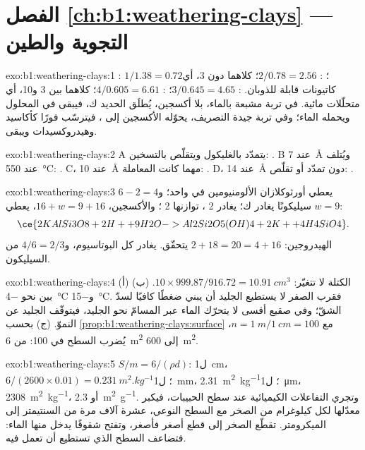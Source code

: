 \section*{الفصل \ref{ch:b1:weathering-clays} --- التجوية والطين}

\begin{solution}{exo:b1:weathering-clays:1}
: $1/1.38 = 0.72$؛ : $2/0.78 = 2.56$؛ كلاهما دون 3، أي كاتيونات قابلة للذوبان. : $3/0.645 = 4.65$؛ : $4/0.605 = 6.61$؛ كلاهما بين 3 و\num{10}، أي متحلّلات مائية. في تربة مشبعة بالماء، بلا أكسجين، يُطلَق الحديد ك، فيبقى في المحلول ويحمله الماء؛ وفي تربة جيدة التصريف، يحوّله الأكسجين إلى ، فيترسّب فورًا كأكاسيد وهيدروكسيدات ويبقى.
\end{solution}

\begin{solution}{exo:b1:weathering-clays:2}
A يتمدّد بالغليكول ويتقلّص بالتسخين: . B عند \SI{7}{\angstrom} ويُتلف عند \SI{550}{\celsius}: . C، عند \SI{10}{\angstrom} مهما كانت المعاملة: . D، عند \SI{14}{\angstrom} دون تمدّد أو تقلّص: .
\end{solution}

\begin{solution}{exo:b1:weathering-clays:3}
يعطي أورثوكلازان الألومنيومين في  واحد؛ و$6 - 2 = 4$ سيليكونًا يغادر ك؛ يغادر 2 ، توازنها 2 ؛ والأكسجين، $16 + w = 9 + 16$، يعطي $w = 9$:
\[
  \ce{2 KAlSi3O8 + 2 H+ + 9 H2O -> Al2Si2O5(OH)4 + 2 K+ + 4 H4SiO4}.
\]
الهيدروجين: $2 + 18 = 20 = 4 + 16$ يتحقّق. يغادر كل البوتاسيوم، و$4/6 =
2/3$ من السيليكون.
\end{solution}

\begin{solution}{exo:b1:weathering-clays:4}
(أ) الكتلة لا تتغيّر: $10 \times 999.87/916.72 = \qty{10.91}{cm^3}$.
(ب) بين نحو \qty{-4}{\celsius} و\qty{-15}{\celsius}. فقرب الصفر لا يستطيع الجليد أن يبني ضغطًا كافيًا لسدّ الشقّ؛ وفي صقيع أقسى لا يتحرّك الماء عبر المسامّ نحو الجليد، فيتوقّف الجليد عن النموّ. (ج) بحسب
\cref{prop:b1:weathering-clays:surface} مع $n = \qty{1}{m}/\qty{1}{cm} = 100$، يُضرب السطح في 100: من \qty{6}{m^2} إلى \qty{600}{m^2}.
\end{solution}

\begin{solution}{exo:b1:weathering-clays:5}
$S/m = 6/(\rho d)$: ل\qty{1}{cm}، $6/(2600\times0.01) =
\qty{0.231}{m^2.kg^{-1}}$؛ ل\qty{1}{mm}، \qty{2.31}{m^2.kg^{-1}}؛ ل\qty{1}{\micro m}، \qty{2308}{m^2.kg^{-1}}، أو \qty{2.3}{m^2.g^{-1}}. وتجري التفاعلات الكيميائية عند سطح الحبيبات، فيكبر معدّلها لكل كيلوغرام من الصخر مع السطح النوعي، عشرة آلاف مرة من السنتيمتر إلى الميكرومتر.  تقطّع الصخر إلى قطع أصغر فأصغر، وتفتح شقوقًا يدخل منها الماء: فتضاعف السطح الذي تستطيع  أن تعمل فيه.
\end{solution}

